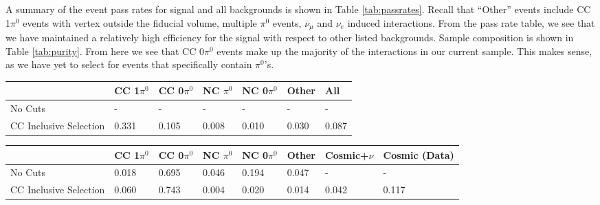 \par A summary of the event pass rates for signal and all backgrounds is shown in Table \ref{tab:passrates}.  Recall that ``Other'' events include CC 1$\pi^0$ events with vertex outside the fiducial volume, multiple $\pi^0$ events, $\overline{\nu}_\mu$ and $\nu_e$ induced interactions.  From the pass rate table, we see that we have maintained a relatively high efficiency for the signal with respect to other listed backgrounds. Sample composition is shown in Table \ref{tab:purity}. From here we see that CC 0$\pi^0$ events make up the majority of the interactions in our current sample. This makes sense, as we have yet to select for events that specifically contain $\pi^0$'s. 

\begin{table}[H]
\centering
{}
 \begin{tabular}{| l | l | l |l|l|l|l|}
 \hline
 & CC 1$\pi^0$ & CC 0$\pi^0$ & NC $\pi^0$ & NC 0$\pi^0$ & Other & All \\ [0.1ex] \hline
No Cuts & - & - & - & - & - & -\\
CC Inclusive Selection& 0.331 & 0.105 & 0.008 & 0.010 & 0.030 & 0.087 \\ \hline
\end{tabular}
\end{table}


\begin{table}[H]
\centering
{}
 \begin{tabular}{| l | l | l |l|l|l|l|l|}
 \hline
 & CC 1$\pi^0$ & CC 0$\pi^0$ & NC $\pi^0$ & NC 0$\pi^0$ & Other & Cosmic+$\nu$ & Cosmic (Data) \\ [0.1ex] \hline
No Cuts & 0.018 & 0.695 & 0.046 & 0.194 & 0.047 & - & -\\ 
CC Inclusive Selection& 0.060 & 0.743 & 0.004 & 0.020 & 0.014 & 0.042 & 0.117 \\ \hline
\end{tabular}
\end{table}

